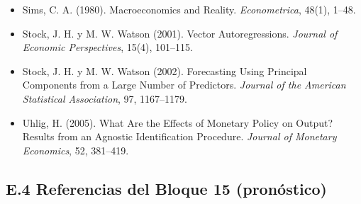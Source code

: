 \documentclass[11pt,a4paper]{article}
\begin{document}
{\begin{itemize}[leftmargin=1.4em,itemsep=1pt,label={}]
\item Sims, C. A. (1980). Macroeconomics and Reality. \emph{Econometrica}, 48(1), 1--48.
\item Stock, J. H. y M. W. Watson (2001). Vector Autoregressions. \emph{Journal of Economic Perspectives}, 15(4), 101--115.
\item Stock, J. H. y M. W. Watson (2002). Forecasting Using Principal Components from a Large Number of Predictors. \emph{Journal of the American Statistical Association}, 97, 1167--1179.
\item Uhlig, H. (2005). What Are the Effects of Monetary Policy on Output? Results from an Agnostic Identification Procedure. \emph{Journal of Monetary Economics}, 52, 381--419.
\end{itemize}
}

\subsection*{E.4 Referencias del Bloque 15 (pronóstico)}
\end{document}
